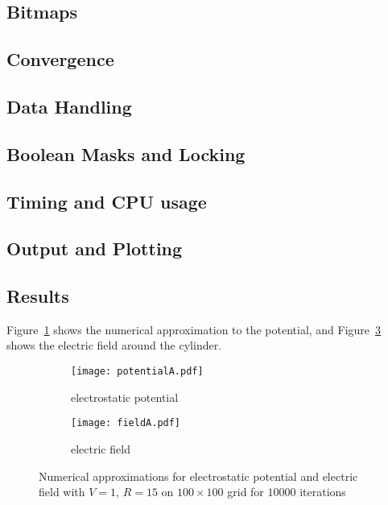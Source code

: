 \documentclass[12pt, a4paper]{article}
\begin{document}
\subsection{Bitmaps}
%

\subsection{Convergence}
%

\subsection{Data Handling}
%

\subsection{Boolean Masks and Locking}
%

\subsection{Timing and CPU usage}

\subsection{Output and Plotting}
%

\subsection{Results}
Figure~\ref{fig:numerical} shows the numerical approximation to the potential,
and Figure~\ref{fig:field} shows the electric field around the cylinder.

\begin{figure}
\centering
\begin{subfigure}[b]{0.7\textwidth}
	\texttt{[image: potentialA.pdf]}
	\caption{electrostatic potential}
	\label{fig:numerical}
\end{subfigure}

\begin{subfigure}[b]{0.7\textwidth}
	\texttt{[image: fieldA.pdf]}
	\caption{electric field}
	\label{fig:field}
\end{subfigure}
\caption{Numerical approximations for electrostatic potential and electric field with
$V=1$, $R=15$ on $100\times100$ grid for $10000$ iterations}
\end{figure}
\end{document}
